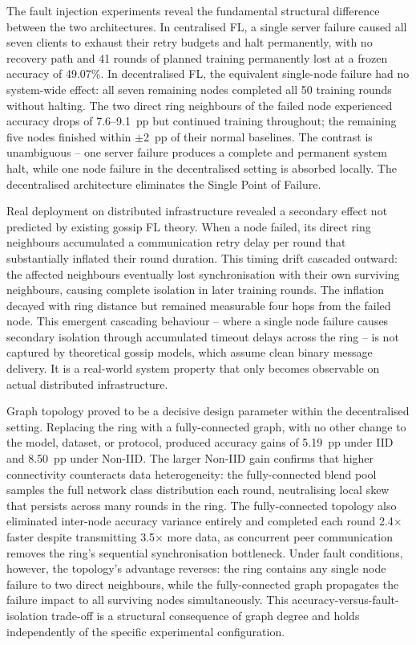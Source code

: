 \documentclass[12pt]{report}
\begin{document}
The fault injection experiments reveal the fundamental structural difference
between the two architectures. In centralised FL, a single server failure caused
all seven clients to exhaust their retry budgets and halt permanently, with no
recovery path and 41 rounds of planned training permanently lost at a frozen
accuracy of 49.07\%. In decentralised FL, the equivalent single-node failure
had no system-wide effect: all seven remaining nodes completed all 50 training
rounds without halting. The two direct ring neighbours of the failed node
experienced accuracy drops of 7.6--9.1~pp but continued training throughout;
the remaining five nodes finished within $\pm$2~pp of their normal baselines.
The contrast is unambiguous -- one server failure produces a complete and
permanent system halt, while one node failure in the decentralised setting is
absorbed locally. The decentralised architecture eliminates the Single Point
of Failure.

Real deployment on distributed infrastructure revealed a secondary effect not
predicted by existing gossip FL theory. When a node failed, its direct ring
neighbours accumulated a communication retry delay per round that substantially
inflated their round duration. This timing drift cascaded outward: the affected
neighbours eventually lost synchronisation with their own surviving neighbours,
causing complete isolation in later training rounds. The inflation decayed with
ring distance but remained measurable four hops from the failed node. This
emergent cascading behaviour -- where a single node failure causes secondary
isolation through accumulated timeout delays across the ring -- is not captured
by theoretical gossip models, which assume clean binary message delivery. It is
a real-world system property that only becomes observable on actual distributed
infrastructure.

Graph topology proved to be a decisive design parameter within the decentralised
setting. Replacing the ring with a fully-connected graph, with no other change to
the model, dataset, or protocol, produced accuracy gains of 5.19~pp under IID
and 8.50~pp under Non-IID. The larger Non-IID gain confirms that higher
connectivity counteracts data heterogeneity: the fully-connected blend pool
samples the full network class distribution each round, neutralising local skew
that persists across many rounds in the ring. The fully-connected topology also
eliminated inter-node accuracy variance entirely and completed each round
2.4$\times$ faster despite transmitting 3.5$\times$ more data, as concurrent
peer communication removes the ring's sequential synchronisation bottleneck.
Under fault conditions, however, the topology's advantage reverses: the ring
contains any single node failure to two direct neighbours, while the
fully-connected graph propagates the failure impact to all surviving nodes
simultaneously. This accuracy-versus-fault-isolation trade-off is a structural
consequence of graph degree and holds independently of the specific experimental
configuration.
\end{document}
